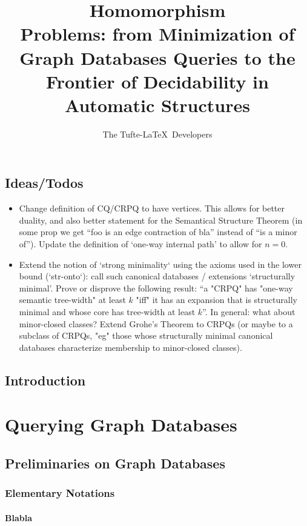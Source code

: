 \documentclass[a4paper,sfsidenotes,twoside,justified,nobib]{tufte-book-custom}
\title[On Homomorphism Problems]{ Homomorphism\\ Problems: from Minimization of Graph Databases Queries to the Frontier of Decidability in Automatic Structures}
\author[The Tufte-LaTeX Developers]{The Tufte-LaTeX\ Developers}
\begin{document}
\frontmatter




\mainmatter
\chapter{Ideas/Todos}

\begin{itemize}
	\item Change definition of CQ/CRPQ to have vertices. This allows for better duality,
		and also better statement for the Semantical Structure Theorem (in some prop we get
		``foo is an edge contraction of bla'' instead of ``is a minor of'').
		Update the definition of `one-way internal path' to allow for $n=0$.
	\item Extend the notion of `strong minimality` using the axioms used in the lower bound (`str-onto`): call such canonical databases / extensions `structurally minimal'.
	Prove or disprove the following result: ``a "CRPQ" has "one-way semantic tree-width" at least $k$ "iff" it has an expansion that is structurally minimal and whose core has tree-width at least $k$''. In general: what about minor-closed classes?
	Extend Grohe's Theorem to CRPQs (or maybe to a subclass of CRPQs, "eg" those whose
	structurally minimal canonical databases characterize membership to minor-closed classes).
\end{itemize}

\lipsum[1-4]

\chapter{Introduction}

\part{Querying Graph Databases}

\chapter{Preliminaries on Graph Databases}

\section{Elementary Notations}

\subsection{Blabla}
\end{document}
